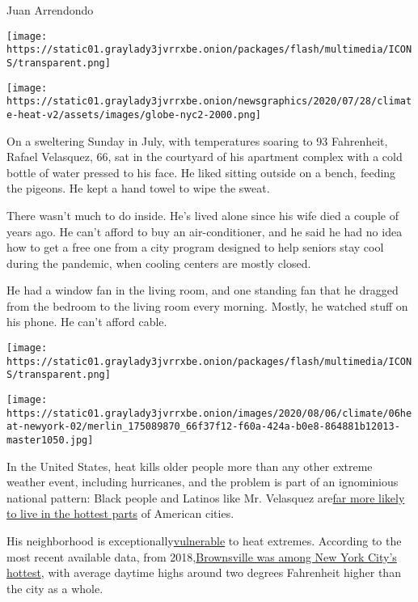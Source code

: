 Juan Arrendondo

\texttt{[image: https://static01.graylady3jvrrxbe.onion/packages/flash/multimedia/ICONS/transparent.png]}

\texttt{[image: https://static01.graylady3jvrrxbe.onion/newsgraphics/2020/07/28/climate-heat-v2/assets/images/globe-nyc2-2000.png]}

On a sweltering Sunday in July, with temperatures soaring to 93
Fahrenheit, Rafael Velasquez, 66, sat in the courtyard of his apartment
complex with a cold bottle of water pressed to his face. He liked
sitting outside on a bench, feeding the pigeons. He kept a hand towel to
wipe the sweat.

There wasn't much to do inside. He's lived alone since his wife died a
couple of years ago. He can't afford to buy an air-conditioner, and he
said he had no idea how to get a free one from a city program designed
to help seniors stay cool during the pandemic, when cooling centers are
mostly closed.

He had a window fan in the living room, and one standing fan that he
dragged from the bedroom to the living room every morning. Mostly, he
watched stuff on his phone. He can't afford cable.

\texttt{[image: https://static01.graylady3jvrrxbe.onion/packages/flash/multimedia/ICONS/transparent.png]}

\texttt{[image: https://static01.graylady3jvrrxbe.onion/images/2020/08/06/climate/06heat-newyork-02/merlin\_175089870\_66f37f12-f60a-424a-b0e8-864881b12013-master1050.jpg]}

In the United States, heat kills older people more than any other
extreme weather event, including hurricanes, and the problem is part of
an ignominious national pattern: Black people and Latinos like Mr.
Velasquez
are\href{https://ehp.niehs.nih.gov/doi/10.1289/ehp.1205919}{}\href{https://ehp.niehs.nih.gov/doi/10.1289/ehp.1205919}{far
more likely to live in the hottest parts} of American cities.

His neighborhood is
exceptionally\href{http://a816-dohbesp.nyc.gov/IndicatorPublic/HeatHub/hvi.html}{}\href{http://a816-dohbesp.nyc.gov/IndicatorPublic/HeatHub/hvi.html}{vulnerable}
to heat extremes. According to the most recent available data, from
2018,\href{http://a816-dohbesp.nyc.gov/IndicatorPublic/VisualizationData.aspx?id=2141,719b87,107,Summarize}{}\href{http://a816-dohbesp.nyc.gov/IndicatorPublic/VisualizationData.aspx?id=2141,719b87,107,Summarize}{Brownsville
was among New York City's hottest}, with average daytime highs around
two degrees Fahrenheit higher than the city as a whole.

